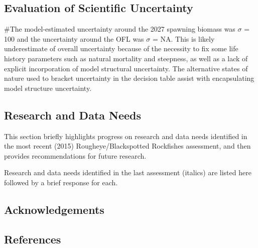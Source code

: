 \documentclass[
]{scrartcl}
\begin{document}
\subsection{Evaluation of Scientific
Uncertainty}\label{evaluation-of-scientific-uncertainty-1}

\#The model-estimated uncertainty around the 2027 spawning biomass was
\(\sigma\) = 100 and the uncertainty around the OFL was \(\sigma\) = NA.
This is likely underestimate of overall uncertainty because of the
necessity to fix some life history parameters such as natural mortality
and steepness, as well as a lack of explicit incorporation of model
structural uncertainty. The alternative states of nature used to bracket
uncertainty in the decision table assist with encapsulating model
structure uncertainty.

\subsection{Research and Data Needs}\label{research-and-data-needs-1}

This section briefly highlights progress on research and data needs
identified in the most recent (2015) Rougheye/Blackspotted Rockfishes
assessment, and then provides recommendations for future research.

Research and data needs identified in the last assessment (italics) are
listed here followed by a brief response for each.

\newpage{}

\subsection{Acknowledgements}\label{sec-acknowledgements}

\newpage{}

\subsection{References}\label{references}
\end{document}
